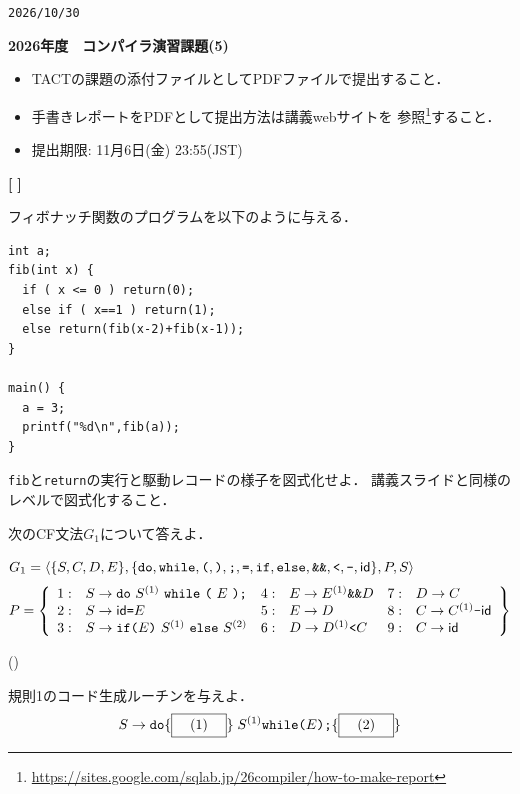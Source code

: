 \documentclass[dvipdfmx]{jarticle}
\newcounter{coffee}
\newcounter{bean}
\begin{document}
\begin{flushright}
\verb|2026/10/30|
\end{flushright}
\begin{center}{\bf\Large
  2026年度　コンパイラ演習課題(5)
}\end{center}
\begin{itemize}
  \item TACTの課題の添付ファイルとしてPDFファイルで提出すること．
  \item 手書きレポートをPDFとして提出方法は講義webサイトを
  参照\footnote{\url{https://sites.google.com/sqlab.jp/26compiler/how-to-make-report}}すること．
  \item 提出期限: 11月6日(金) 23:55(JST)
\end{itemize}

\begin{list}{{\bf [\,\,]}}{}
 \item フィボナッチ関数のプログラムを以下のように与える．

       \begin{Verbatim}[frame=single]
int a;
fib(int x) {
  if ( x <= 0 ) return(0);
  else if ( x==1 ) return(1);
  else return(fib(x-2)+fib(x-1));
}

main() {
  a = 3;
  printf("%d\n",fib(a));
}
       \end{Verbatim}

       \verb|fib|と\verb|return|の実行と駆動レコードの様子を図式化せよ．
       講義スライドと同様のレベルで図式化すること．

\item 次のCF文法$G_1$について答えよ．

$G_1=\langle\{S,C,D,E\},\{\texttt{do},\texttt{while},\texttt{(},\texttt{)},\texttt{;},\texttt{=},\texttt{if},\texttt{else},\texttt{\&\&},\texttt{<},\texttt{-},\mathsf{id}\},P,S\rangle$
\[P=\left\{\begin{array}{llllll}
  1: & S\rightarrow\texttt{do}\ S^{(1)}\ \texttt{while}\ \texttt{(}\ E\ \texttt{)}\texttt{;} &
  4: & E\rightarrow E^{(1)}\texttt{\&\&} D & 7: & D\rightarrow C\\
  2: & S\rightarrow\mathsf{id}\texttt{=} E & 5: & E\rightarrow D & 8: & C\rightarrow C^{(1)}\texttt{-}\mathsf{id}\\
  3: & S\rightarrow\texttt{if}\texttt{(} E\texttt{)}\ S^{(1)}\ \texttt{else}\ S^{(2)} &
  6: & D\rightarrow D^{(1)}\texttt{<} C & 9: & C\rightarrow\mathsf{id}
\end{array}\right\}\]

\begin{list}{()}{}
  \item 規則1のコード生成ルーチンを与えよ．
  \[S\rightarrow\texttt{do}\{\fbox{\mbox{\quad (1)\quad}}\}\;S^{(1)}\texttt{while}\texttt{(} E\texttt{)}\texttt{;}
  \{\fbox{\quad (2)\quad}\}\]


\end{list}
\end{list}
\end{document}
